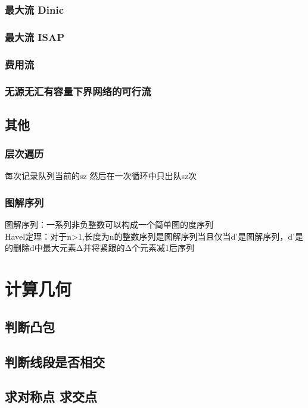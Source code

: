 \documentclass{report}
\begin{document}
        \subsection{最大流 Dinic}
            
        \subsection{最大流 ISAP}
            
        \subsection{费用流}
            
        \subsection{无源无汇有容量下界网络的可行流}
            
    \section{其他}
        \subsection{层次遍历}
            每次记录队列当前的sz 然后在一次循环中只出队sz次
        \subsection{图解序列}
            图解序列：一系列非负整数可以构成一个简单图的度序列 \\
            Havel定理：对于n>1,长度为n的整数序列是图解序列当且仅当d'是图解序列，d'是的删除d中最大元素Δ并将紧跟的Δ个元素减1后序列
\chapter{计算几何}
    \section{判断凸包}
    
    \section{判断线段是否相交}
    
    \section{求对称点 求交点}
    
\end{document}
